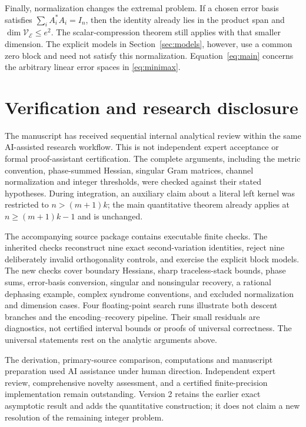\documentclass[11pt]{article}
\newcommand{\E}{\mathcal E}
\newcommand{\V}{\mathcal V}
\theoremstyle{remark}
\numberwithin{equation}{section}
\begin{document}
Finally, normalization changes the extremal problem. If a chosen error
basis satisfies $\sum_i A_i^*A_i=I_n$, then the identity already lies
in the product span and $\dim\V_{\E}\le e^2$. The scalar-compression
theorem still applies with that smaller dimension. The explicit models
in Section~\ref{sec:models}, however, use a common zero block and need
not satisfy this normalization. Equation~\eqref{eq:main} concerns the
arbitrary linear error spaces in \eqref{eq:minimax}.


\section*{Verification and research disclosure}

The manuscript has received sequential internal analytical review within
the same AI-assisted research workflow. This is not independent expert
acceptance or formal proof-assistant certification. The complete arguments,
including the metric convention, phase-summed Hessian, singular Gram
matrices, channel normalization and integer thresholds, were checked
against their stated hypotheses. During integration, an auxiliary claim
about a literal left kernel was restricted to $n>(m+1)k$; the main
quantitative theorem already applies at $n\ge(m+1)k-1$ and is unchanged.

The accompanying source package contains executable finite checks. The
inherited checks reconstruct nine exact second-variation identities, reject
nine deliberately invalid orthogonality controls, and exercise the explicit
block models. The new checks cover boundary Hessians, sharp traceless-stack
bounds, phase sums, error-basis conversion, singular and nonsingular
recovery, a rational dephasing example, complex syndrome conventions,
and excluded normalization and dimension cases. Four floating-point
search runs illustrate both descent branches and the encoding--recovery
pipeline. Their small residuals are diagnostics, not certified interval
bounds or proofs of universal correctness. The universal statements rest
on the analytic arguments above.

The derivation, primary-source comparison, computations and manuscript
preparation used AI assistance under human direction. Independent expert
review, comprehensive novelty assessment, and a certified finite-precision
implementation remain outstanding. Version 2 retains the earlier exact
asymptotic result and adds the quantitative construction; it does not
claim a new resolution of the remaining integer problem.
\end{document}

